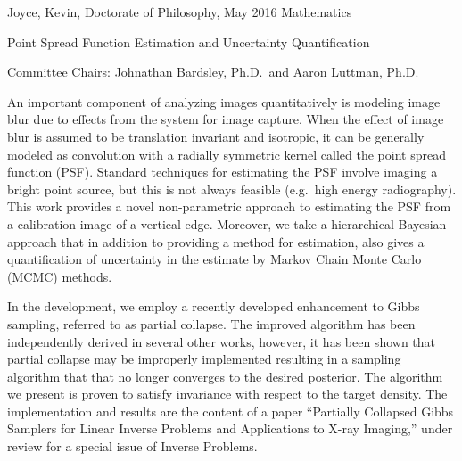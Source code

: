 %
%
\setcounter{page}{2}                    %
%
%

Joyce, Kevin, Doctorate of Philosophy, May 2016 \hfill Mathematics
   
Point Spread Function Estimation and Uncertainty Quantification

%
Committee Chairs: Johnathan Bardsley, Ph.D.~and Aaron Luttman, Ph.D.    %
%
\setlength{\parindent}{2ex}
%
%


\indent 
An important component of analyzing images quantitatively is modeling image blur due to effects from the system for image capture. 
When the effect of image blur is assumed to be translation invariant and isotropic, it can be generally modeled as convolution with a radially symmetric kernel called the point spread function (PSF).
Standard techniques for estimating the PSF involve imaging a bright point source, but this is not always feasible (e.g.~high energy radiography).  
This work provides a novel non-parametric approach to estimating the PSF from a calibration image of a vertical edge.
Moreover, we take a hierarchical Bayesian approach that in addition to providing a method for estimation, also gives a quantification of uncertainty in the estimate by Markov Chain Monte Carlo (MCMC) methods.

\indent
In the development, we employ a recently developed enhancement to Gibbs sampling, referred to as partial collapse. 
The improved algorithm has been independently derived in several other works, however, it has been shown that partial collapse may be improperly implemented resulting in a sampling algorithm that that no longer converges to the desired posterior.
The algorithm we present is proven to satisfy invariance with respect to the target density.
The implementation and results are the content of a paper ``Partially Collapsed Gibbs Samplers for Linear Inverse Problems and Applications to X-ray Imaging,'' under review for a special issue of Inverse Problems.

